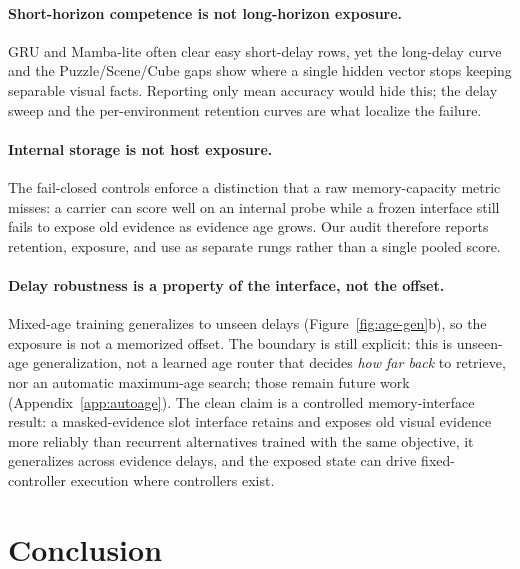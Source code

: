 \paragraph{Short-horizon competence is not long-horizon exposure.}
GRU and Mamba-lite often clear easy short-delay rows, yet the long-delay curve
and the Puzzle/Scene/Cube gaps show where a single hidden vector stops keeping
separable visual facts.  Reporting only mean accuracy would hide this; the delay
sweep and the per-environment retention curves are what localize the failure.

\paragraph{Internal storage is not host exposure.}
The fail-closed controls enforce a distinction that a raw memory-capacity metric
misses: a carrier can score well on an internal probe while a frozen interface
still fails to expose old evidence as evidence age grows.  Our audit therefore
reports retention, exposure, and use as separate rungs rather than a single
pooled score.

\paragraph{Delay robustness is a property of the interface, not the offset.}
Mixed-age training generalizes to unseen delays
(Figure~\ref{fig:age-gen}b), so the exposure is not a
memorized offset.  The boundary is still explicit: this is unseen-age
generalization, not a learned age router that decides \emph{how far back} to
retrieve, nor an automatic maximum-age search; those remain future work
(Appendix~\ref{app:autoage}).  The clean claim is a controlled memory-interface
result: a masked-evidence slot interface retains and exposes old visual evidence
more reliably than recurrent alternatives trained with the same objective, it
generalizes across evidence delays, and the exposed state can drive
fixed-controller execution where controllers exist.

\section{Conclusion}

